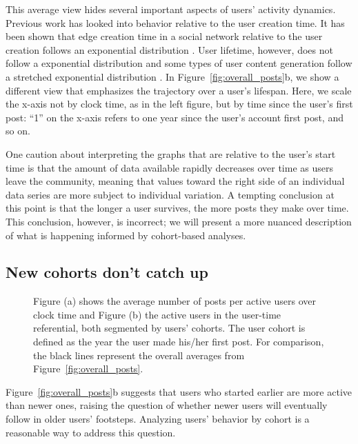This average view hides several important aspects of users' activity dynamics. Previous work has looked into behavior relative to the user creation time. It has been shown that edge creation time in a social network relative to the user creation follows an exponential distribution \cite{Tomkins2008}. User lifetime, however, does not follow a exponential distribution and some types of user content generation follow a stretched exponential distribution \cite{Guo2009}. In Figure~\ref{fig:overall_posts}b, we show a different view that emphasizes the trajectory over a user's lifespan.  Here, we scale the x-axis not by clock time, as in the left figure, but by time since the user's first post: ``1'' on the x-axis refers to one year since the user's account first post, and so on.

One caution about interpreting the graphs that are relative to the user's start time is that the amount of data available rapidly decreases over time as users leave the community, meaning that values toward the right side of an individual data series are more subject to individual variation.  A tempting conclusion at this point is that the longer a user survives, the more posts they make over time.  This conclusion, however, is incorrect; we will present a more nuanced description of what is happening informed by cohort-based analyses.


\subsection{New cohorts don't catch up}

\begin{figure*}[!tb]
\centering
{}
\caption{Figure (a) shows the average number of posts per active users over clock time and Figure (b) the active users in the user-time referential, both segmented by users' cohorts. The user cohort is defined as the year the user made his/her first post.  For comparison, the black lines represent the overall averages from Figure~\ref{fig:overall_posts}.}
\label{fig:avr_posts_per_user_over_time_cohorts}
\end{figure*}

Figure~\ref{fig:overall_posts}b suggests that users who started earlier are more active than newer ones, raising the question of whether newer users
will eventually follow in older users' footsteps.  Analyzing users' behavior by cohort is a reasonable way to address this question.  

